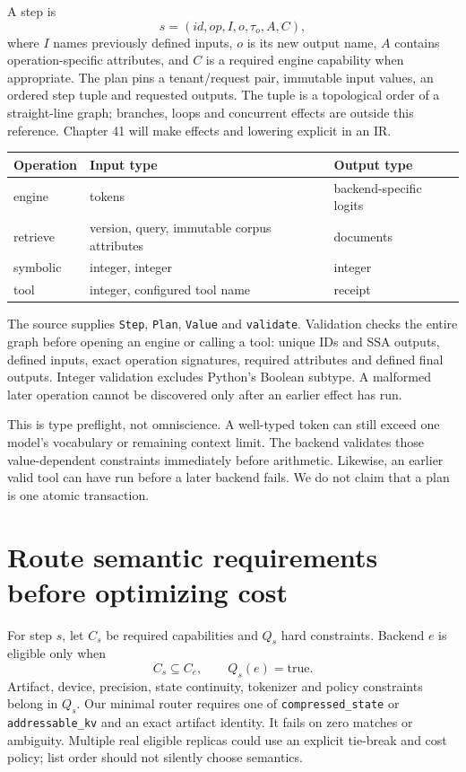 A step is
\[
 s=(id,op,I,o,\tau_o,A,C),
\]
where $I$ names previously defined inputs, $o$ is its new output name, $A$
contains operation-specific attributes, and $C$ is a required engine capability
when appropriate. The plan pins a tenant/request pair, immutable input values,
an ordered step tuple and requested outputs. The tuple is a topological order
of a straight-line graph; branches, loops and concurrent effects are outside
this reference. Chapter 41 will make effects and lowering explicit in an IR.

\begin{center}
\begin{tabular}{lll}\toprule
Operation & Input type & Output type\\\midrule
engine & tokens & backend-specific logits\\
retrieve & version, query, immutable corpus attributes & documents\\
symbolic & integer, integer & integer\\
tool & integer, configured tool name & receipt\\\bottomrule
\end{tabular}
\end{center}
The source supplies \texttt{Step}, \texttt{Plan}, \texttt{Value} and
\texttt{validate}. Validation checks the entire graph before opening an
engine or calling a tool: unique IDs and SSA outputs, defined inputs, exact
operation signatures, required attributes and defined final outputs.
Integer validation excludes Python's Boolean subtype. A malformed later
operation cannot be discovered only after an earlier effect has run.

This is type preflight, not omniscience. A well-typed token can still exceed
one model's vocabulary or remaining context limit. The backend validates those
value-dependent constraints immediately before arithmetic. Likewise, an
earlier valid tool can have run before a later backend fails. We do not claim
that a plan is one atomic transaction.

\section{Route semantic requirements before optimizing cost}
\label{evod39:routing}
For step $s$, let $C_s$ be required capabilities and $Q_s$ hard constraints.
Backend $e$ is eligible only when
\[
 C_s\subseteq C_e,\qquad Q_s(e)=\mathrm{true}.
\]
Artifact, device, precision, state continuity, tokenizer and policy constraints
belong in $Q_s$. Our minimal router requires one of
\texttt{compressed\_state} or \texttt{addressable\_kv} and an exact artifact
identity. It fails on zero matches or ambiguity. Multiple real eligible
replicas could use an explicit tie-break and cost policy; list order should
not silently choose semantics.

